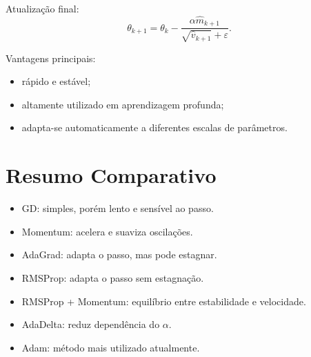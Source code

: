 \documentclass[9pt,a4paper]{extarticle}
\begin{document}
Atualização final:
\[
\theta_{k+1} = \theta_k - \frac{\alpha \hat{m}_{k+1}}{\sqrt{\hat{v}_{k+1}} + \varepsilon}.
\]

Vantagens principais:
\begin{itemize}
    \item rápido e estável;
    \item altamente utilizado em aprendizagem profunda;
    \item adapta-se automaticamente a diferentes escalas de parâmetros.
\end{itemize}

\section{Resumo Comparativo}

\begin{itemize}
    \item GD: simples, porém lento e sensível ao passo.
    \item Momentum: acelera e suaviza oscilações.
    \item AdaGrad: adapta o passo, mas pode estagnar.
    \item RMSProp: adapta o passo sem estagnação.
    \item RMSProp + Momentum: equilíbrio entre estabilidade e velocidade.
    \item AdaDelta: reduz dependência do $\alpha$.
    \item Adam: método mais utilizado atualmente.
\end{itemize}
\end{document}
